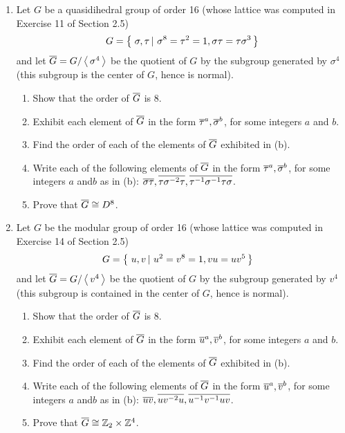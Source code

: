 \documentclass[10pt,a4paper]{report}
\begin{document}
\begin{enumerate}
	\item Let $G$ be a quasidihedral group of order 16 (whose lattice was computed in Exercise 11 of Section 2.5)
	\begin{align*}
		G = \left \{\, \left . \sigma, \tau \, \right |\, \sigma^8=\tau^2=1, \sigma\tau=\tau\sigma^3 \,\right \}
	\end{align*}and let $\overline{G}=G/\left \langle\, \sigma^4 \,\right \rangle$ be the quotient of $G$ by the subgroup generated by $\sigma^4$ (this subgroup is the center of $G$, hence is normal).
	\begin{enumerate}
		\item Show that the order of $\overline{G}$ is 8.
		\item Exhibit each element of $\overline{G}$ in the form $\overline{\tau}^a,\overline{\sigma}^b$, for some integers $a$ and $b$.
		\item Find the order of each of the elements of $\overline{G}$ exhibited in (b).
		\item Write each of the following elements of $\overline{G}$ in the form $\overline{\tau}^a,\overline{\sigma}^b$, for some integers $a$ and$b$ as in (b): $\overline{\sigma\tau}, \overline{\tau\sigma^{-2}\tau}, \overline{\tau^{-1}\sigma^{-1}\tau\sigma}$.
		\item Prove that $\overline{G}\cong D^8$.
	\end{enumerate}
	
	\item Let $G$ be the modular group of order 16 (whose lattice was computed in Exercise 14 of Section 2.5)
	\begin{align*}
		G &= \left \{\, \left . u,v \, \right |\,u^2=v^8=1, vu=uv^5 \,\right \}
	\end{align*}and let $\overline{G}=G/\left \langle\, v^4 \,\right \rangle$ be the quotient of $G$ by the subgroup generated by $v^4$ (this subgroup is contained in the center of $G$, hence is normal).
	\begin{enumerate}
		\item Show that the order of $\overline{G}$ is 8.
		
		\item Exhibit each element of $\overline{G}$ in the form $\overline{u}^a,\overline{v}^b$, for some integers $a$ and $b$.
		\item Find the order of each of the elements of $\overline{G}$ exhibited in (b).
		\item Write each of the following elements of $\overline{G}$ in the form $\overline{u}^a,\overline{v}^b$, for some integers $a$ and$b$ as in (b): $\overline{uv}, \overline{uv^{-2}u}, \overline{u^{-1}v^{-1}uv}$.
		\item Prove that $\overline{G}\cong \mathbb{Z}_2 \times \mathbb{Z}^4$.
	\end{enumerate}
	

\end{enumerate}
\end{document}
